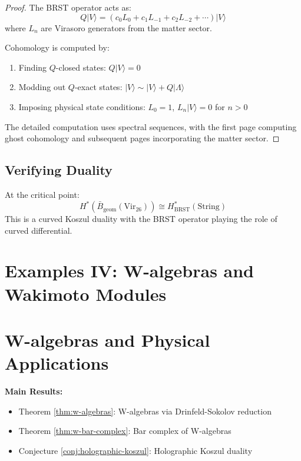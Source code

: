 \begin{proof}
The BRST operator acts as:
\[
Q|V\rangle = \left(c_0L_0 + c_1L_{-1} + c_2L_{-2} + \cdots\right)|V\rangle
\]
where $L_n$ are Virasoro generators from the matter sector.
 
Cohomology is computed by:
\begin{enumerate}
\item Finding $Q$-closed states: $Q|V\rangle = 0$
\item Modding out $Q$-exact states: $|V\rangle \sim |V\rangle + Q|\Lambda\rangle$
\item Imposing physical state conditions: $L_0 = 1$, $L_n|V\rangle = 0$ for $n > 0$
\end{enumerate}
 
The detailed computation uses spectral sequences, with the first page computing ghost cohomology and 
subsequent pages incorporating the matter sector.
\end{proof}
 
\subsection{Verifying Duality}
 
\begin{theorem}
At the critical point:
\[
H^*(\bar{B}_{\text{geom}}(\text{Vir}_{26})) \cong H^*_{\text{BRST}}(\text{String})
\]
This is a curved Koszul duality with the BRST operator playing the role of curved differential.
\end{theorem}
 
\section{Examples IV: W-algebras and Wakimoto Modules}

\section{W-algebras and Physical Applications}


\textbf{Main Results:}
\begin{itemize}
\item Theorem \ref{thm:w-algebras}: W-algebras via Drinfeld-Sokolov reduction
\item Theorem \ref{thm:w-bar-complex}: Bar complex of W-algebras
\item Conjecture \ref{conj:holographic-koszul}: Holographic Koszul duality
\end{itemize}

